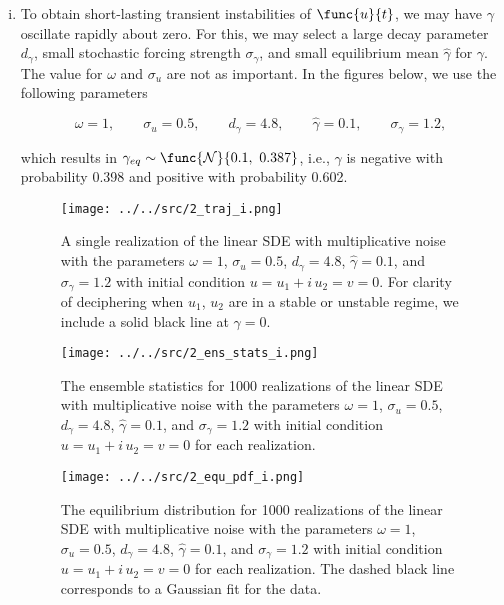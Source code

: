 \begin{enumerate}[(i)]
	\item To obtain short-lasting transient instabilities of $\func{u}{t}$, we may have $\gamma$ oscillate rapidly about zero. For this, we may select a large decay parameter $d_{\gamma}$, small stochastic forcing strength $\sigma_{\gamma}$, and small equilibrium mean $\widehat{\gamma}$ for $\gamma$. The value for $\omega$ and $\sigma_u$ are not as important. In the figures below, we use the following parameters
	
	\begin{equation}
		\omega = 1,\qquad \sigma_u = 0.5,\qquad d_{\gamma} = 4.8,\qquad \widehat{\gamma} = 0.1,\qquad \sigma_{\gamma} = 1.2,
	\end{equation}
	
	which results in $\gamma_{eq} \sim \func{\mathcal{N}}{0.1,\ 0.387}$, i.e., $\gamma$ is negative with probability 0.398 and positive with probability 0.602.
	
	\begin{figure}[H]
		\centering
		\texttt{[image: ../../src/2\_traj\_i.png]}
		\caption{A single realization of the linear SDE with multiplicative noise with the parameters $\omega = 1$, $\sigma_u = 0.5$, $d_{\gamma} = 4.8$, $\widehat{\gamma} = 0.1$, and $\sigma_{\gamma} = 1.2$ with initial condition $u = u_1 + i\,u_2 = v = 0$. For clarity of deciphering when $u_1$, $u_2$ are in a stable or unstable regime, we include a solid black line at $\gamma = 0$.}
		\label{fig:2_traj_i}
	\end{figure}
	
	\begin{figure}[H]
		\centering
		\texttt{[image: ../../src/2\_ens\_stats\_i.png]}
		\caption{The ensemble statistics for 1000 realizations of the linear SDE with multiplicative noise with the parameters $\omega = 1$, $\sigma_u = 0.5$, $d_{\gamma} = 4.8$, $\widehat{\gamma} = 0.1$, and $\sigma_{\gamma} = 1.2$ with initial condition $u = u_1 + i\,u_2 = v = 0$ for each realization.}
		\label{fig:2_ens_stats_i}
	\end{figure}
	
	\begin{figure}[H]
		\centering
		\texttt{[image: ../../src/2\_equ\_pdf\_i.png]}
		\caption{The equilibrium distribution for 1000 realizations of the linear SDE with multiplicative noise with the parameters $\omega = 1$, $\sigma_u = 0.5$, $d_{\gamma} = 4.8$, $\widehat{\gamma} = 0.1$, and $\sigma_{\gamma} = 1.2$ with initial condition $u = u_1 + i\,u_2 = v = 0$ for each realization. The dashed black line corresponds to a Gaussian fit for the data.}
		\label{fig:2_equ_pdf_i}
	\end{figure}
	

\end{enumerate}
